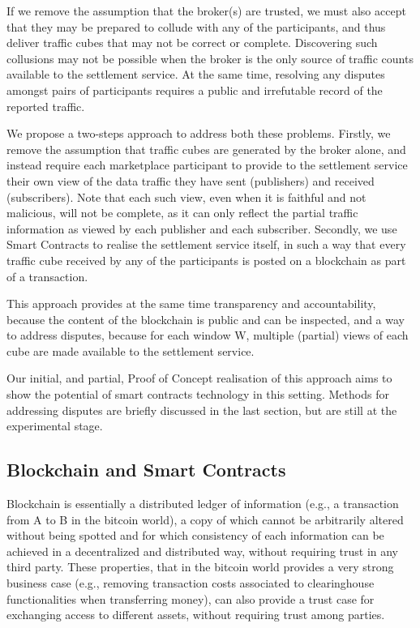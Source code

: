 \documentclass[conference]{IEEEtran}
\begin{document}
If we remove the assumption that the broker(s) are trusted, we must also accept that they may be prepared to collude with any of the participants, and thus deliver traffic cubes that may not be correct or complete.
Discovering such collusions may not be possible when the broker is the only source of traffic counts available to the settlement service.  At the same time, resolving any disputes amongst pairs of participants requires a public and irrefutable record of the reported traffic.

We propose a two-steps approach to address both these problems.
Firstly, we remove the assumption that traffic cubes are generated by the broker alone, and instead require each marketplace participant to provide to the settlement service their own view of the data traffic they have sent (publishers) and received (subscribers).
Note that each such view, even when it is faithful and not malicious, will not be complete, as it can only reflect the partial traffic information as viewed by each publisher and each subscriber.
Secondly, we use Smart Contracts to realise the settlement service itself, in such a way that every traffic cube received by any of the participants is posted on a blockchain as part of a transaction.

This  approach provides at the same time transparency and accountability, because the content of the blockchain is public and can be inspected, and a way to address disputes, because for each window W, multiple (partial) views of each cube are made available to the settlement service.

Our initial, and partial, Proof of Concept realisation of this approach aims to show the potential of smart contracts technology in this setting. Methods for addressing disputes are briefly discussed in the last section, but are still at the experimental stage.


\subsection{Blockchain and Smart Contracts}


Blockchain is essentially a distributed ledger of information (e.g., a transaction from A to B in the bitcoin world), a copy of which cannot be arbitrarily altered without being spotted and for which consistency of each information can be achieved in a decentralized and distributed way, without requiring trust in any third party. These properties, that in the bitcoin world provides a very strong business case (e.g., removing transaction costs associated to clearinghouse functionalities when transferring money), can also provide a trust case for exchanging access to different assets, without requiring trust among parties.
\end{document}

